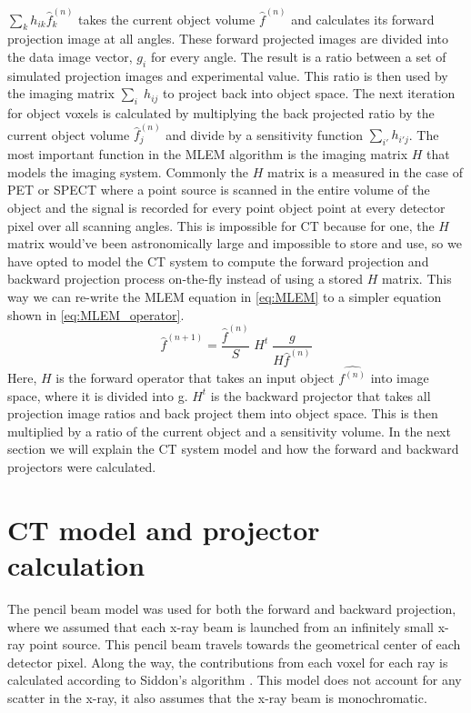 $\sum\limits_k h_{ik} \hat{f}_k^{(n)}$ takes the current object volume $\hat{f}^{(n)}$ and calculates its forward projection image at all angles.  These forward projected images are divided into the data image vector, $g_i$ for every angle.  The result is a ratio between a set of simulated projection images and experimental value.  This ratio is then used by the imaging matrix $\sum\limits_i \; h_{ij}$ to project back into object space.  The next iteration for object voxels is calculated by multiplying the back projected ratio by the current object volume $\hat{f}_j^{(n)}$ and divide by a sensitivity function $\sum\limits_{i'} h_{i'j}$.
The most important function in the MLEM algorithm is the imaging matrix $H$ that models the imaging system.  Commonly the $H$ matrix is a measured in the case of PET or SPECT where a point source is scanned in the entire volume of the object and the signal is recorded for every point object point at every detector pixel over all scanning angles.  This is impossible for CT because for one, the $H$ matrix would've been astronomically large and impossible to store and use, so we have opted to model the CT system to compute the forward projection and backward projection process on-the-fly instead of using a stored $H$ matrix.  This way we can re-write the MLEM equation in \ref{eq:MLEM} to a simpler equation shown in \ref{eq:MLEM_operator}.
\begin{equation}
\hat{f}^{(n+1)} = \frac{\hat{f}^{(n)}}{S} \; H^{t} \; \frac{g}{H \hat{f}^{(n)}}
\label{eq:MLEM_operator}
\end{equation}
Here, $H$ is the forward operator that takes an input object $\hat{f^{(n)}}$ into image space, where it is divided into g.  $H^t$ is the backward projector that takes all projection image ratios and back project them into object space.  This is then multiplied by a ratio of the current object and a sensitivity volume.  In the next section we will explain the CT system model and how the forward and backward projectors were calculated.

\section{CT model and projector calculation}
The pencil beam model was used for both the forward and backward projection, where we assumed that each x-ray beam is launched from an infinitely small x-ray point source. This pencil beam travels towards the geometrical center of each detector pixel.  Along the way, the contributions from each voxel for each ray is calculated according to Siddon's algorithm \cite{Siddon1985}.  This model does not account for any scatter in the x-ray, it also assumes that the x-ray beam is monochromatic.

